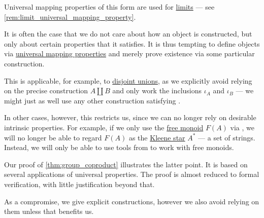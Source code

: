 \begin{remark}
  Universal mapping properties of this form are used for \hyperref[def:category_of_cones/limit]{limits} --- see \cref{rem:limit_universal_mapping_property}.
\end{remark}

\begin{remark}\label{rem:definition_via_characterization}
  It is often the case that we do not care about how an object is constructed, but only about certain properties that it satisfies. It is thus tempting to define objects via \hyperref[rem:universal_mapping_property]{universal mapping properties} and merely prove existence via some particular construction.

  This is applicable, for example, to \hyperref[def:disjoint_union]{disjoint unions}, as we explicitly avoid relying on the precise construction \( A \amalg B \) and only work the inclusions \( \iota_A \) and \( \iota_B \) --- we might just as well use any other construction satisfying .

  In other cases, however, this restricts us, since we can no longer rely on desirable intrinsic properties. For example, if we only use the \hyperref[def:free_monoid]{free monoid} \( F(A) \) via , we will no longer be able to regard \( F(A) \) as the \hyperref[def:formal_language/kleene_star]{Kleene star} \( A^* \) --- a set of strings. Instead, we will only be able to use tools from  to work with free monoids.

  Our proof of \cref{thm:group_coproduct} illustrates the latter point. It is based on several applications of universal properties. The proof is almost reduced to formal verification, with little justification beyond that.

  As a compromise, we give explicit constructions, however we also avoid relying on them unless that benefits us.
\end{remark}

